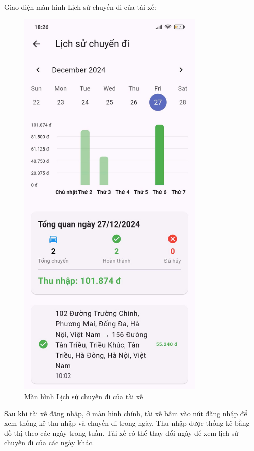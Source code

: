 \documentclass[../DoAn.tex]{subfiles}
\begin{document}
Giao diện màn hình Lịch sử chuyến đi của tài xế:
\begin{figure}[H]
    \centering
    \includegraphics[width=0.8\textwidth]{Hinhve/Lich_su_chuyen_di_driver.png}
    \caption{Màn hình Lịch sử chuyến đi của tài xế}
    \label{fig:Lich_su_chuyen_di_driver}
\end{figure}
Sau khi tài xế đăng nhập, ở màn hình chính, tài xế bấm vào nút đăng nhập để xem thống kê thu nhập và chuyến đi trong ngày.
Thu nhập được thống kê bằng đồ thị theo các ngày trong tuần.
Tài xế có thể thay đổi ngày để xem lịch sử chuyến đi của các ngày khác.
\end{document}
